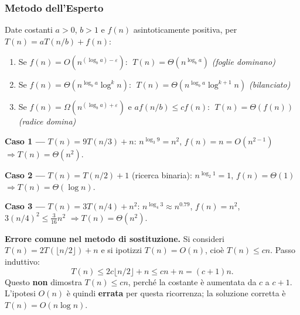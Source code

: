 \subsubsection{Metodo dell'Esperto}

\begin{teorema}
	Date costanti $a>0$, $b>1$ e $f(n)$ asintoticamente positiva,
	per $T(n) = aT(n/b) + f(n)$:
	
	\begin{enumerate}
		\item Se $f(n) = O(n^{(\log_b a)-\varepsilon})$:
		$\;T(n) = \Theta(n^{\log_b a})$
		\hfill\textit{(foglie dominano)}
		
		\item Se $f(n) = \Theta(n^{\log_b a}\log^k n)$:
		$\;T(n) = \Theta(n^{\log_b a}\log^{k+1} n)$
		\hfill\textit{(bilanciato)}
		
		\item Se $f(n) = \Omega(n^{(\log_b a)+\varepsilon})$
		e $af(n/b)\le cf(n)$:
		$\;T(n) = \Theta(f(n))$
		\hfill\textit{(radice domina)}
	\end{enumerate}
\end{teorema}

\begin{esempio}
	\textbf{Caso 1 —} $T(n) = 9T(n/3) + n$:
	$n^{\log_3 9} = n^2$, $f(n)=n=O(n^{2-1})$ $\Rightarrow T(n)=\Theta(n^2)$.
\end{esempio}

\begin{esempio}
	\textbf{Caso 2 —} $T(n) = T(n/2) + 1$ (ricerca binaria):
	$n^{\log_2 1}=1$, $f(n)=\Theta(1)$ $\Rightarrow T(n)=\Theta(\log n)$.
\end{esempio}

\begin{esempio}
	\textbf{Caso 3 —} $T(n) = 3T(n/4) + n^2$:
	$n^{\log_4 3}\approx n^{0.79}$, $f(n)=n^2$, $3(n/4)^2 \le \tfrac{3}{16}n^2$
	$\Rightarrow T(n)=\Theta(n^2)$.
\end{esempio}

\begin{hardnote}
	\textbf{Errore comune nel metodo di sostituzione.}
	Si consideri $T(n) = 2T(\lfloor n/2 \rfloor) + n$ e si ipotizzi
	$T(n) = O(n)$, cioè $T(n) \le cn$.
	Passo induttivo:
	\[
	T(n) \le 2c\lfloor n/2 \rfloor + n \le cn + n = (c+1)n.
	\]
	Questo \textbf{non} dimostra $T(n) \le cn$, perché la costante
	è aumentata da $c$ a $c+1$. L'ipotesi $O(n)$ è quindi \textbf{errata}
	per questa ricorrenza; la soluzione corretta è $T(n) = O(n \log n)$.
\end{hardnote}

